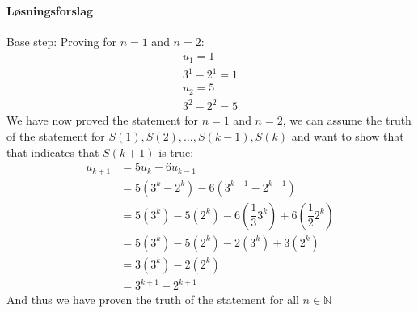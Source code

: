 \paragraph*{Løsningsforslag}
Base step: Proving for $n=1$ and $n=2$:
\begin{align*}
    u_1 = 1\\
    3^1-2^1 = 1\\
    u_2 = 5\\
    3^2-2^2 = 5
\end{align*}
We have now proved the statement for $n=1$ and $n=2$, we can assume the truth of the statement for $S(1), S(2), \dots,S(k-1), S(k)$ and want to show that that indicates that $S(k+1)$ is true:
\begin{align*}
    u_{k+1} &= 5u_{k}-6u_{k-1}\\
    &= 5(3^k-2^k)-6(3^{k-1}-2^{k-1})\\
    &= 5(3^k)-5(2^k)-6(\dfrac{1}{3}3^k)+6(\dfrac{1}{2}2^k)\\
    &= 5(3^k)-5(2^k)-2(3^k)+3(2^k)\\
    &= 3(3^k)-2(2^k)\\
    &= 3^{k+1}-2^{k+1}
\end{align*}
And thus we have proven the truth of the statement for all $n \in \mathbb{N}$

